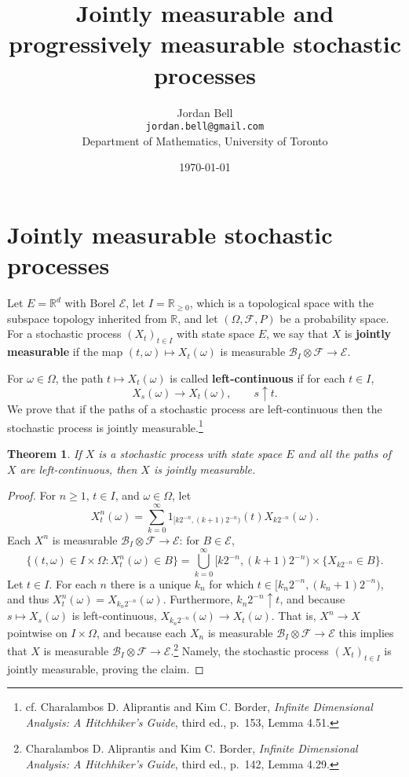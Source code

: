\documentclass{article}
\newtheorem{theorem}{Theorem}
\theoremstyle{definition}
\begin{document}
\title{Jointly measurable and progressively measurable stochastic processes}
\author{Jordan Bell\\ \texttt{jordan.bell@gmail.com}\\Department of Mathematics, University of Toronto}
\date{\today}

\maketitle

\section{Jointly measurable stochastic processes}
Let $E=\mathbb{R}^d$  with Borel $\mathscr{E}$, 
let $I = \mathbb{R}_{\geq 0}$, which is a topological  space with the subspace topology inherited from $\mathbb{R}$,
and let
$(\Omega,\mathscr{F},P)$ be a probability space.
For a stochastic process $(X_t)_{t \in I}$ with state space $E$,
we say that
$X$ is \textbf{jointly measurable} if the map
$(t,\omega) \mapsto X_t(\omega)$ is measurable $\mathscr{B}_I \otimes \mathscr{F} \to \mathscr{E}$. 

For $\omega \in \Omega$, the path $t \mapsto X_t(\omega)$ is called
\textbf{left-continuous} if 
for each $t \in I$,
\[
X_s(\omega) \to X_t(\omega),\qquad s \uparrow t.
\] 
We prove that if the paths of a stochastic process are left-continuous then the stochastic process
is jointly measurable.\footnote{cf. Charalambos D. Aliprantis and Kim C. Border, {\em Infinite Dimensional Analysis:
A Hitchhiker's Guide}, third ed., p.~153, Lemma 4.51.}

\begin{theorem}
If $X$ is a stochastic process with state space $E$ and  all the paths of $X$ are left-continuous, then $X$ is
jointly measurable.
\end{theorem}
\begin{proof}
For $n \geq 1$, $t \in I$, and  $\omega \in \Omega$, let 
\[
X^n_t(\omega) = \sum_{k=0}^\infty 1_{[k2^{-n}, (k+1)2^{-n})}(t) X_{k 2^{-n}}(\omega).
\]
Each $X^n$ is measurable $\mathscr{B}_I \otimes \mathscr{F} \to \mathscr{E}$:
for $B \in \mathscr{E}$,
\[
\{(t,\omega) \in I \times \Omega: X^n_t(\omega) \in B\}
=\bigcup_{k=0}^\infty [k2^{-n},(k+1)2^{-n}) \times \{X_{k2^{-n}} \in B\}.
\]
Let $t \in I$.
For each $n$ there is a unique $k_n$ for which $t \in [k_n2^{-n},(k_n+1)2^{-n})$, and 
thus $X_t^n(\omega) = X_{k_n 2^{-n}}(\omega)$. Furthermore, $k_n2^{-n} \uparrow t$, and because 
 $s \mapsto X_s(\omega)$ is left-continuous,  $X_{k_n 2^{-n}}(\omega) \to X_t(\omega)$.
That is, 
$X^n \to X$ pointwise on $I \times \Omega$, 
and because each $X_n$ is measurable 
$\mathscr{B}_I \otimes \mathscr{F} \to \mathscr{E}$ this implies that
$X$ is measurable $\mathscr{B}_I \otimes \mathscr{F} \to \mathscr{E}$.\footnote{Charalambos D. Aliprantis and Kim C. Border, {\em Infinite Dimensional Analysis:
A Hitchhiker's Guide}, third ed., p.~142, Lemma 4.29.} Namely, the stochastic process $(X_t)_{t \in I}$ is jointly measurable, proving the claim.
\end{proof}
\end{document}
